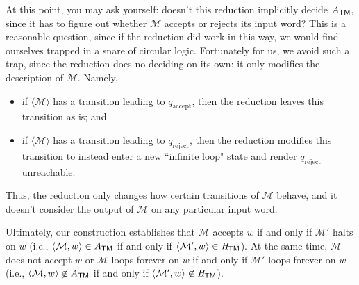 At this point, you may ask yourself: doesn't this reduction implicitly decide $A_{\textsf{TM}}$, since it has to figure out whether $\mathcal{M}$ accepts or rejects its input word? This is a reasonable question, since if the reduction did work in this way, we would find ourselves trapped in a snare of circular logic. Fortunately for us, we avoid such a trap, since the reduction does no deciding on its own: it only modifies the description of $\mathcal{M}$. Namely,
\begin{colouredbox}
\begin{itemize}
\item if $\langle \mathcal{M} \rangle$ has a transition leading to $q_{\text{accept}}$, then the reduction leaves this transition as is; and
\item if $\langle \mathcal{M} \rangle$ has a transition leading to $q_{\text{reject}}$, then the reduction modifies this transition to instead enter a new ``infinite loop" state and render $q_{\text{reject}}$ unreachable.
\end{itemize}
\end{colouredbox}
Thus, the reduction only changes how certain transitions of $\mathcal{M}$ behave, and it doesn't consider the output of $\mathcal{M}$ on any particular input word.

Ultimately, our construction establishes that $\mathcal{M}$ accepts $w$ if and only if $\mathcal{M}'$ halts on $w$ (i.e., $\langle \mathcal{M}, w \rangle \in A_{\textsf{TM}}$ if and only if $\langle \mathcal{M}', w \rangle \in \mathit{H}_{\textsf{TM}}$). At the same time, $\mathcal{M}$ does not accept $w$ or $\mathcal{M}$ loops forever on $w$ if and only if $\mathcal{M}'$ loops forever on $w$ (i.e., $\langle \mathcal{M}, w \rangle \not\in A_{\textsf{TM}}$ if and only if $\langle \mathcal{M}', w \rangle \not\in \mathit{H}_{\textsf{TM}}$).

